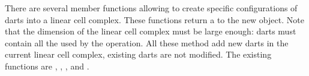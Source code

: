 There are several member functions allowing to create specific
configurations of darts into a linear cell complex. These functions
return a  to the new object.  Note
that the dimension of the linear cell complex must be large enough:
darts must contain all the \betats{} used by the operation.  All these
method add new darts in the current linear cell complex, existing
darts are not modified. The existing functions
are , , %
, and . %


